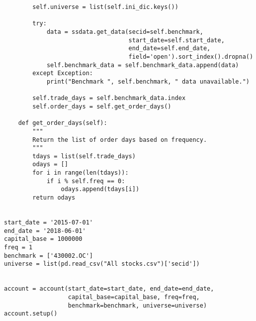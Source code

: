 \documentclass[11pt]{article}
\begin{document}
\begin{lstlisting}
        self.universe = list(self.ini_dic.keys())

        try:
            data = ssdata.get_data(secid=self.benchmark,
                                   start_date=self.start_date,
                                   end_date=self.end_date,
                                   field='open').sort_index().dropna()
            self.benchmark_data = self.benchmark_data.append(data)
        except Exception:
            print("Benchmark ", self.benchmark, " data unavailable.")

        self.trade_days = self.benchmark_data.index
        self.order_days = self.get_order_days()

    def get_order_days(self):
        """
        Return the list of order days based on frequency.
        """
        tdays = list(self.trade_days)
        odays = []
        for i in range(len(tdays)):
            if i % self.freq == 0:
                odays.append(tdays[i])
        return odays


start_date = '2015-07-01'
end_date = '2018-06-01'
capital_base = 1000000
freq = 1
benchmark = ['430002.OC']
universe = list(pd.read_csv("All stocks.csv")['secid'])


account = account(start_date=start_date, end_date=end_date,
                  capital_base=capital_base, freq=freq,
                  benchmark=benchmark, universe=universe)
account.setup()
\end{lstlisting}
\end{document}
